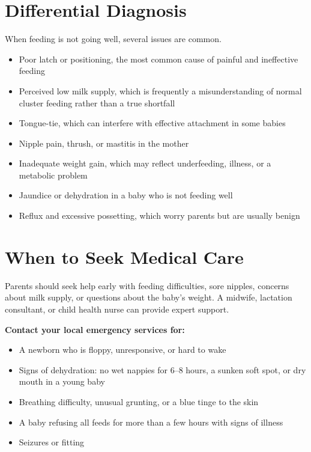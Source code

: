 \section*{Differential Diagnosis}
When feeding is not going well, several issues are common.
\begin{itemize}
    \item Poor latch or positioning, the most common cause of painful and ineffective feeding
    \item Perceived low milk supply, which is frequently a misunderstanding of normal cluster feeding rather than a true shortfall
    \item Tongue-tie, which can interfere with effective attachment in some babies
    \item Nipple pain, thrush, or mastitis in the mother
    \item Inadequate weight gain, which may reflect underfeeding, illness, or a metabolic problem
    \item Jaundice or dehydration in a baby who is not feeding well
    \item Reflux and excessive possetting, which worry parents but are usually benign
\end{itemize}

\section*{When to Seek Medical Care}
Parents should seek help early with feeding difficulties, sore nipples, concerns about milk supply, or questions about the baby's weight. A midwife, lactation consultant, or child health nurse can provide expert support.

\textbf{Contact your local emergency services for:}
\begin{itemize}
    \item A newborn who is floppy, unresponsive, or hard to wake
    \item Signs of dehydration: no wet nappies for 6--8 hours, a sunken soft spot, or dry mouth in a young baby
    \item Breathing difficulty, unusual grunting, or a blue tinge to the skin
    \item A baby refusing all feeds for more than a few hours with signs of illness
    \item Seizures or fitting
\end{itemize}

